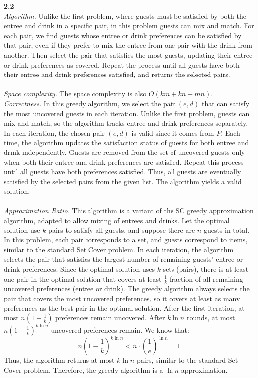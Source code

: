\documentclass[11pt]{exam}
\begin{document}
\noindent\textbf{2.2}\\
\noindent\textit{Algorithm.}
Unlike the first problem, where guests must be satisfied by both the entree and drink in a specific pair, 
in this problem guests can mix and match. 
For each pair, we find guests whose entree or drink preferences can be satisfied by that pair, 
even if they prefer to mix the entree from one pair with the drink from another. 
Then select the pair that satisfies the most guests, updating their entree or drink preferences as covered. 
Repeat the process until all guests have both their entree and drink preferences satisfied, and returns the selected pairs.
\\
\\
\noindent\textit{Space complexity.}
The space complexity is also $O(km+kn+mn)$.\\

\noindent\textit{Correctness.}
In this greedy algorithm, we select the pair $(e,d)$ that can satisfy the most uncovered guests in each iteration.
Unlike the first problem, guests can mix and match, so the algorithm tracks entree and drink preferences separately.
In each iteration, the chosen pair $(e,d)$ is valid since it comes from $P$. Each time, the algorithm updates the satisfaction status of guests for both entree and drink independently.
Guests are removed from the set of uncovered guests only when both their entree and drink preferences are satisfied.
Repeat this process until all guests have both preferences satisfied.
Thus, all guests are eventually satisfied by the selected pairs from the given list. The algorithm yields a valid solution.
\\
\\
\noindent\textit{Approximation Ratio.}
This algorithm is a variant of the SC greedy approximation algorithm, adapted to allow mixing of entrees and drinks.
Let the optimal solution use $k$ pairs to satisfy all guests, and suppose there are $n$ guests in total.
In this problem, each pair corresponds to a set, and guests correspond to items, similar to the standard Set Cover problem.
In each iteration, the algorithm selects the pair that satisfies the largest number of remaining guests’ entree or drink preferences.
Since the optimal solution uses $k$ sets (pairs), there is at least one pair in the optimal solution that covers at least $\frac{1}{k}$ fraction of all remaining uncovered preferences (entree or drink).
The greedy algorithm always selects the pair that covers the most uncovered preferences, so it covers at least as many preferences as the best pair in the optimal solution.
After the first iteration, at most $n\left(1-\frac{1}{k}\right)$ preferences remain uncovered.
After $k\ln n$ rounds, at most $n\left(1-\frac{1}{k}\right)^{k\ln n}$ uncovered preferences remain.
We know that:
$$n\left(1-\frac{1}{k}\right)^{k\ln n} < n \cdot \left(\frac{1}{e}\right)^{\ln n} = 1$$
Thus, the algorithm returns at most $k\ln n$ pairs, similar to the standard Set Cover problem.
Therefore, the greedy algorithm is a $\ln n$-approximation.\
\end{document}
